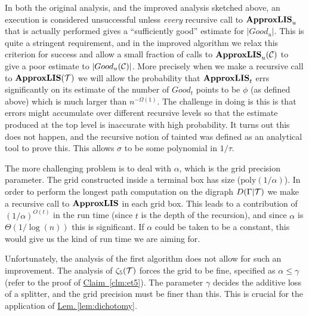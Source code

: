 \documentclass{acmsmall}
\newcommand{\cC}{{\cal C}}
\newcommand{\cT}{{\cal T}}
\newcommand{\Lem}[1]{\hyperref[lem:#1]{Lem.\,\ref*{lem:#1}}} %
\newcommand{\Clm}[1]{\hyperref[clm:#1]{Claim~\ref*{clm:#1}}} %
\newcommand{\taintprob}{\phi}
\newcommand{\poly}{\textrm{poly}}
\newcommand{\width}{{\bf {\rm  w}}}
\newcommand{\gridprec}{\alpha}
\newcommand{\errorterm}{\zeta}
\newcommand{\ssz}{\sigma}
\newcommand{\approxlis}{{\rm {\bf ApproxLIS}}}
\begin{document}
In both the original analysis, and the improved analysis sketched above, an execution is considered unsuccessful
unless {\em every} recursive call to $\approxlis_u$ that is actually performed gives a ``sufficiently good''
estimate for $|Good_u|$.  This is quite a stringent requirement, and in the improved algorithm 
we relax this criterion for success and allow a small
fraction of calls to $\approxlis_u(\cC)$ to give a poor estimate to $|Good_u(\cC)|$.
More precisely when we make a recursive call to $\approxlis(\cT)$ we will allow the probability 
that $\approxlis_t$ errs significantly on its
estimate of the number of $Good_t$ points to be $\taintprob$ (as defined above)
which is much larger than $n^{-\Omega(1)}$.
The challenge in doing is this is that errors might accumulate over different recursive levels
so that the estimate produced at the top level is inaccurate with high probability.  It turns out
this does not happen, and
the  recursive notion of tainted was defined as an analytical tool to prove this. 
This allows $\ssz$ to be some polynomial in $1/\tau$. 


The more challenging problem is to deal with $\gridprec$, which is the grid precision parameter.
The grid constructed inside a terminal box has size ($\poly(1/\gridprec)$).  In order to perform the longest path
computation on the digraph $D(\Gamma|\cT)$ we 
make a recursive call to $\approxlis$  in each grid box.  
This leads to a contribution of $(1/\gridprec)^{O(t)}$
in the run time (since $t$ is the depth of the recursion), and since $\gridprec$ is $\Theta(1/\log(n))$
this is significant.   If $\gridprec$ could be taken to be a constant, this would give us the kind of run time
we are aiming for.

Unfortunately, the analysis of the first algorithm does not allow for such an improvement. 
The analysis of $\errorterm_5(\cT)$ forces the grid to be fine, specified as $\gridprec \leq \gamma$ (refer to the proof of \Clm{et5}). 
The parameter $\gamma$ decides the additive loss of a splitter, and the grid precision must be finer than this.
This is crucial for the application of \Lem{dichotomy}.

\end{document}
